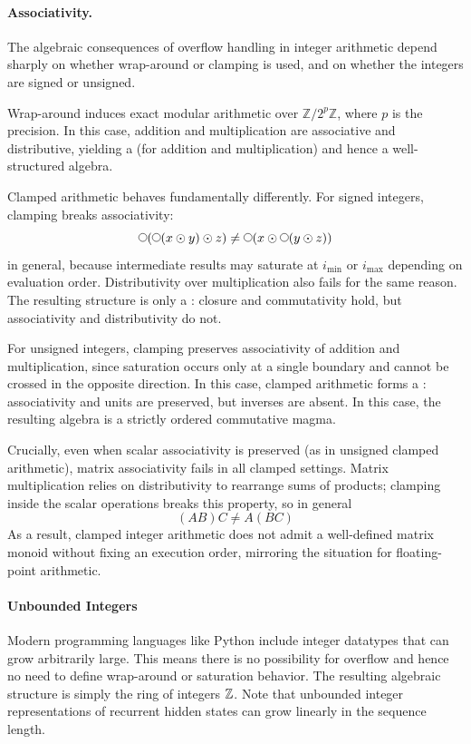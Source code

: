 \documentclass{article}
\begin{document}
\paragraph{Associativity.}
The algebraic consequences of overflow handling in integer arithmetic depend sharply on whether wrap-around or clamping is used, and on whether the integers are signed or unsigned.

Wrap-around induces exact modular arithmetic over $\mathbb{Z}/2^p\mathbb{Z}$, where $p$ is the precision. In this case, addition and multiplication are associative and distributive, yielding a  (for addition and multiplication) and hence a well-structured algebra.

Clamped arithmetic behaves fundamentally differently. For signed integers, clamping breaks associativity:
$$\wrap(\wrap (x \odot y)\odot z) \neq \wrap(x \odot \wrap (y\odot z))$$
in general, because intermediate results may saturate at $i_{\min}$ or $i_{\max}$ depending on evaluation order. Distributivity over multiplication also fails for the same reason. The resulting structure is only a : closure and commutativity hold, but associativity and distributivity do not.

For unsigned integers, clamping preserves associativity of addition and multiplication, since saturation occurs only at a single boundary and cannot be crossed in the opposite direction. In this case, clamped arithmetic forms a : associativity and units are preserved, but inverses are absent.
In this case, the resulting algebra is a strictly ordered commutative magma.

Crucially, even when scalar associativity is preserved (as in unsigned clamped arithmetic), matrix associativity fails in all clamped settings. Matrix multiplication relies on distributivity to rearrange sums of products; clamping inside the scalar operations breaks this property, so in general
$$
(AB)C \neq A(BC)
$$
As a result, clamped integer arithmetic does not admit a well-defined matrix monoid without fixing an execution order, mirroring the situation for floating-point arithmetic.

\paragraph{Unbounded Integers}
Modern programming languages like Python include integer datatypes that can grow arbitrarily large.
This means there is no possibility for overflow and hence no need to define wrap-around or saturation behavior.
The resulting algebraic structure is simply the ring of integers $\mathbb{Z}$.
Note that unbounded integer representations of recurrent hidden states can grow linearly in the sequence length.
\end{document}
